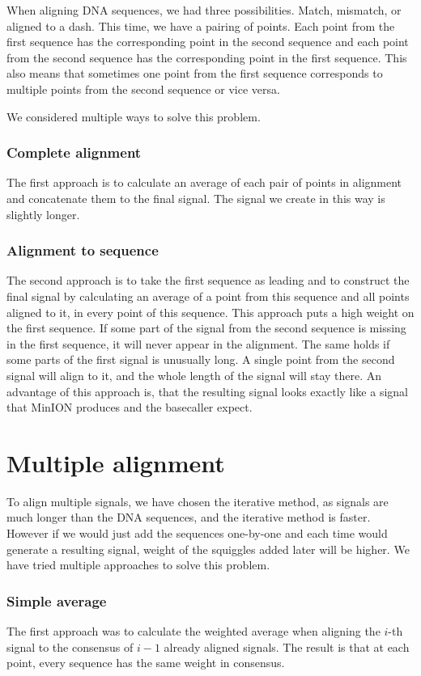 When aligning DNA sequences, we had three possibilities. Match, mismatch, or aligned to a dash. 
This time, we have a pairing of points. Each point from the first sequence has the corresponding point
in the second sequence and each point from the second sequence has the corresponding point
in the first sequence. This also means that sometimes one point from the first sequence corresponds to multiple points from the second sequence or vice versa.

We considered multiple ways to solve this problem.
\subsubsection{Complete alignment}
The first approach is to calculate an average of each pair of points in alignment and concatenate them to the final signal. The signal we create in this way is slightly longer.

\subsubsection{Alignment to sequence}
The second approach is to take the first sequence as leading and to construct the final signal by calculating an average of a point from this sequence and all points aligned to it, in every point of this sequence. 
This approach puts a high weight on the first sequence.
If some part of the signal from the second sequence is missing in the first sequence, it will never appear in the alignment.
The same holds if some parts of the first signal is unusually long. A single point from the second signal will align to it, and the whole length of the signal will stay there.
An advantage of this approach is, that the resulting signal looks exactly like a signal that MinION produces and the basecaller expect.

\section{Multiple alignment}

To align multiple signals, we have chosen the iterative method, as signals are much longer than the DNA sequences, and the iterative method is faster.
However if we would just add the sequences one-by-one and each time would generate a resulting signal, weight of the squiggles added later will be higher.
We have tried multiple approaches to solve this problem.
\subsubsection{Simple average}
The first approach was to calculate the weighted average when aligning the $i$-th signal to the consensus of $i-1$ already aligned signals. 
The result is that at each point, every sequence has the same weight in consensus.
